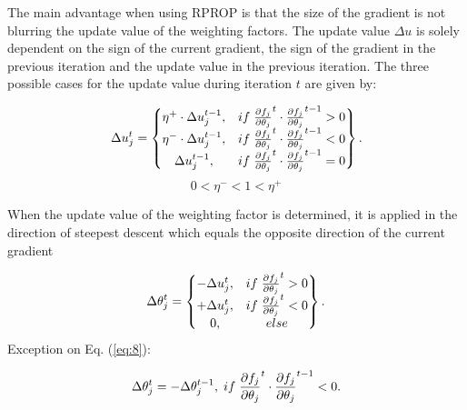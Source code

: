The main advantage when using RPROP is that the size of the gradient is not blurring the update value of the weighting factors. The update value $\Delta u$ is solely dependent on the sign of the current gradient, the sign of the gradient in the previous iteration and the update value in the previous iteration. The three possible cases for the update value during iteration $t$ are given by: 

\begin{equation}\label{eq:7}
	\Delta u^t_j =
	\begin{Bmatrix}
		 \eta^+ \cdot \Delta u^{t-1}_j, & if \hspace{1 mm} \pdv{f_j}{\theta_j}^t \cdot \pdv{f_j}{\theta_j}^{t-1} > 0 \\
		 \eta^- \cdot \Delta u^{t-1}_j, & if \hspace{1 mm} \pdv{f_j}{\theta_j}^t \cdot \pdv{f_j}{\theta_j}^{t-1} < 0 \\
		  \Delta u^{t-1}_j, & if \hspace{1 mm} \pdv{f_j}{\theta_j}^t \cdot \pdv{f_j}{\theta_j}^{t-1} = 0 \\
	\end{Bmatrix}.
\end{equation}
\begin{equation}\label{eq:9}
0 <\eta^-<1<\eta^+
\end{equation}

When the update value of the weighting factor is determined, it is applied in the direction of steepest descent which equals the opposite direction of the current gradient

\begin{equation}\label{eq:8}
\Delta \theta^t_j =
\begin{Bmatrix}
	-\Delta u^t_j, & if \hspace{1 mm} \pdv{f_j}{\theta_j}^t > 0 \\
	+ \Delta u^t_j, & if \hspace{1 mm} \pdv{f_j}{\theta_j}^t < 0 \\
	0, & else 
\end{Bmatrix}.
\end{equation}
Exception on Eq. (\ref{eq:8}):

\begin{equation}\label{eq:10}
	\Delta \theta^t_j = -\Delta \theta^{t-1}_j, \hspace{1mm} if \hspace{1mm} \pdv{f_j}{\theta_j}^t \cdot \pdv{f_j}{\theta_j}^{t-1} < 0.
\end{equation}



